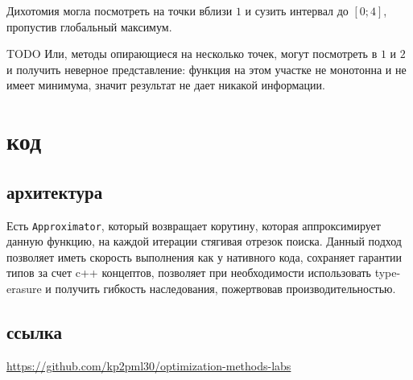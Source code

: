 \documentclass[russian, english]{article}
\def\code#1{\texttt{#1}}
\begin{document}
Дихотомия могла посмотреть на точки вблизи $1$ и сузить интервал до $[0;4]$, пропустив глобальный максимум.
\par
{\color{red} TODO} 
Или, методы опирающиеся на несколько точек, могут посмотреть в $1$ и $2$ и получить неверное представление: функция на этом участке не монотонна и не имеет минимума, значит результат не дает никакой информации.

\newpage
\appendix
\section{код}
\subsection{архитектура}
Есть \code{Approximator}, который возвращает корутину, которая аппроксимирует данную функцию, на каждой итерации стягивая отрезок поиска. Данный подход позволяет иметь скорость выполнения как у нативного кода, сохраняет гарантии типов за счет c++ концептов, позволяет при необходимости использовать type-erasure и получить гибкость наследования, пожертвовав производительностью.

\subsection{ссылка}
\url{https://github.com/kp2pml30/optimization-methods-labs}
\end{document}
